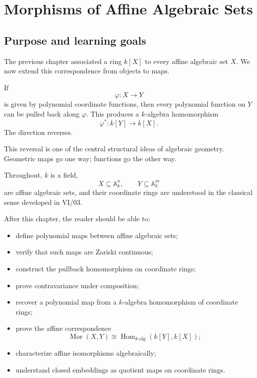%
%

\chapter{Morphisms of Affine Algebraic Sets}
\label{ch:morphisms-affine-algebraic-sets}

\section*{Purpose and learning goals}

The previous chapter associated a ring \(k[X]\) to every affine algebraic set \(X\).
We now extend this correspondence from objects to maps.

If
\[
\varphi:X\longrightarrow Y
\]
is given by polynomial coordinate functions, then every polynomial function on \(Y\) can
be pulled back along \(\varphi\).  This produces a \(k\)-algebra homomorphism
\[
\varphi^\ast:k[Y]\longrightarrow k[X].
\]
The direction reverses.

This reversal is one of the central structural ideas of algebraic geometry.  Geometric maps
go one way; functions go the other way.

Throughout, \(k\) is a field,
\[
X\subseteq\mathbb A_k^n,
\qquad
Y\subseteq\mathbb A_k^m
\]
are affine algebraic sets, and their coordinate rings are understood in the classical sense
developed in VI/03.

After this chapter, the reader should be able to:
\begin{itemize}
  \item define polynomial maps between affine algebraic sets;
  \item verify that such maps are Zariski continuous;
  \item construct the pullback homomorphism on coordinate rings;
  \item prove contravariance under composition;
  \item recover a polynomial map from a \(k\)-algebra homomorphism of coordinate rings;
  \item prove the affine correspondence
        \[
        \operatorname{Mor}(X,Y)
        \cong
        \operatorname{Hom}_{k\text{-alg}}(k[Y],k[X]);
        \]
  \item characterize affine isomorphisms algebraically;
  \item understand closed embeddings as quotient maps on coordinate rings.
\end{itemize}

